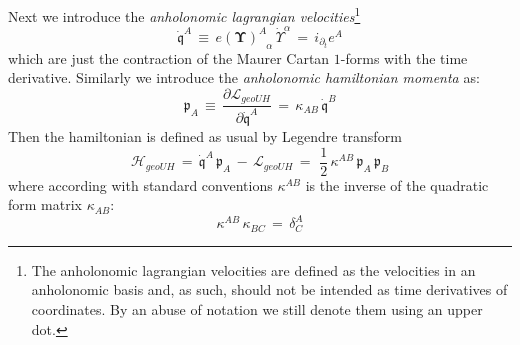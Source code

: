 \documentclass[10pt,a4paper]{article}
\newcommand{\ft}[2]{{\textstyle\frac{#1}{#2}}}
\begin{document}
Next we introduce the \textit{anholonomic lagrangian velocities}\footnote{The anholonomic lagrangian velocities are defined as the velocities in an anholonomic basis and, as such, should not be intended as time derivatives of coordinates. By an abuse of notation we still denote them using an upper dot.}
\begin{equation}\label{anhovelo}
  \dot{\mathfrak{q}}^A \, \equiv \, e(\boldsymbol{\Upsilon})^{A}_{\phantom{A}\alpha} \,\dot{\Upsilon}^\alpha \, = \, i_{\partial_t} e^{A}
\end{equation}
which are just the contraction of the Maurer Cartan $1$-forms with the time derivative. Similarly we introduce the \textit{anholonomic hamiltonian momenta} as:
\begin{equation}\label{anhomome}
  {\mathfrak{p}}_A \, \equiv \, \frac{\partial \mathcal{L}_{geoUH} }{\partial \dot{\mathfrak{q}}^A}\, =\,   \kappa_{AB} \,  \dot{\mathfrak{q}}^B
\end{equation}
Then the hamiltonian is defined as usual by Legendre transform
\begin{equation}\label{anhohamilla}
  \mathcal{H}_{geoUH} \, = \, \dot{\mathfrak{q}}^A \,{\mathfrak{p}}_A \, - \, \mathcal{L}_{geoUH} \, = \, \, \ft 12 \,\kappa^{AB} \, {\mathfrak{p}}_A \, {\mathfrak{p}}_B
\end{equation}
where according with standard conventions $\kappa^{AB}$ is the inverse of the quadratic form matrix $\kappa_{AB}$:
\begin{equation}\label{grimaldello}
  \kappa^{AB} \, \kappa_{BC} \, = \, \delta^A_C
\end{equation}
\end{document}
